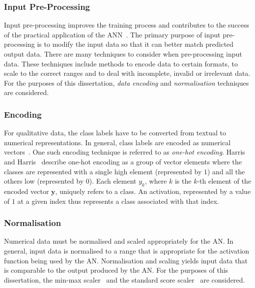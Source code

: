 \subsubsection{Input Pre-Processing}\label{sec:anns:an:input:input_pre_processing}

Input pre-processing improves the training process and contributes to the success of the practical application of the \acs{ANN}~\cite{ref:kuzniar:2017}. The primary purpose of input pre-processing is to modify the input data so that it can better match predicted output data. There are many techniques to consider when pre-processing input data. These techniques include methods to encode data to certain formats, to scale to the correct ranges and to deal with incomplete, invalid or irrelevant data. For the purposes of this dissertation, \textit{data encoding} and \textit{normalisation} techniques are considered.


\subsubsection{Encoding}\label{sec:anns:an:input:encoding}

For qualitative data, the class labels have to be converted from textual to numerical representations. In general, class labels are encoded as numerical vectors~\cite{ref:srinidhi:2018, ref:brownlee:2017:one-hot}. One such encoding technique is referred to as \textit{one-hot encoding}. Harris and Harris~\cite{ref:harris:2010} describe one-hot encoding as a group of vector elements where the classes are represented with a single high element (represented by $1$) and all the others low (represented by $0$). Each element $y_k$, where $k$ is the $k$-th element of the encoded vector $\boldsymbol{y}$, uniquely refers to a class. An activation, represented by a value of $1$ at a given index thus represents a class associated with that index.

\subsubsection{Normalisation}\label{sec:anns:an:input:normalisation}

Numerical data must be normalised and scaled appropriately for the \acs{AN}. In general, input data is normalised to a range that is appropriate for the activation function being used by the \acs{AN}. Normalisation and scaling yields input data that is comparable to the output produced by the \acs{AN}. For the purposes of this dissertation, the min-max scaler~\cite{ref:al:2006} and the standard score scaler~\cite{ref:jain:2005} are considered.

